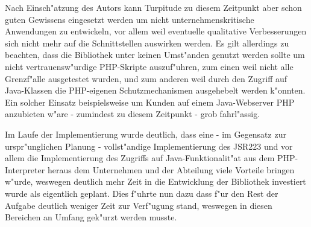 Nach Einsch"atzung des Autors kann Turpitude zu diesem Zeitpunkt aber schon guten Gewissens eingesetzt werden um 
nicht unternehmenskritische Anwendungen zu entwickeln, vor allem weil eventuelle qualitative Verbesserungen
sich nicht mehr auf die Schnittstellen auswirken werden. Es gilt allerdings zu beachten, dass die Bibliothek unter
keinen Umst"anden genutzt werden sollte um nicht vertrauensw"urdige PHP-Skripte auszuf"uhren, zum einen weil
nicht alle Grenzf"alle ausgetestet wurden, und zum anderen weil durch den Zugriff auf Java-Klassen die PHP-eigenen
Schutzmechanismen ausgehebelt werden k"onnten. Ein solcher Einsatz beispielsweise um Kunden auf einem Java-Webserver 
PHP anzubieten w"are - zumindest zu diesem Zeitpunkt - grob fahrl"assig.

Im Laufe der Implementierung wurde deutlich, dass eine - im Gegensatz zur urspr"unglichen Planung - vollst"andige
Implementierung des JSR223 und vor allem die Implementierung des Zugriffs auf Java-Funktionalit"at aus dem PHP-Interpreter heraus
dem Unternehmen und der Abteilung viele Vorteile bringen w"urde, weswegen
deutlich mehr Zeit in die Entwicklung der Bibliothek investiert wurde als eigentlich geplant. Dies f"uhrte nun
dazu dass f"ur den Rest der Aufgabe deutlich weniger Zeit zur Verf"ugung stand, weswegen in diesen Bereichen an
Umfang gek"urzt werden musste.

